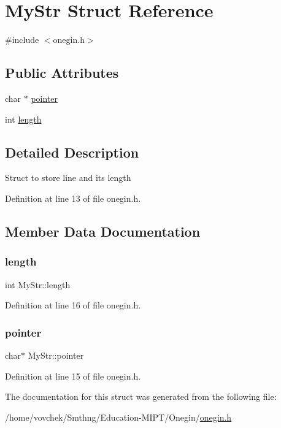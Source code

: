 \hypertarget{struct_my_str}{}\section{My\+Str Struct Reference}
\label{struct_my_str}


{\ttfamily \#include $<$onegin.\+h$>$}

\subsection*{Public Attributes}
\begin{DoxyCompactItemize}
\item 
char $\ast$ \hyperlink{struct_my_str_a46a731a64758ccc8a3c3f6ba531e860a}{pointer}
\item 
int \hyperlink{struct_my_str_abe750a45eca40ac1887722c2904d9006}{length}
\end{DoxyCompactItemize}


\subsection{Detailed Description}
Struct to store line and its length 

Definition at line 13 of file onegin.\+h.



\subsection{Member Data Documentation}
\mbox{\label{struct_my_str_abe750a45eca40ac1887722c2904d9006}} 
\subsubsection{\texorpdfstring{length}{length}}
{\footnotesize\ttfamily int My\+Str\+::length}



Definition at line 16 of file onegin.\+h.

\mbox{\label{struct_my_str_a46a731a64758ccc8a3c3f6ba531e860a}} 
\subsubsection{\texorpdfstring{pointer}{pointer}}
{\footnotesize\ttfamily char$\ast$ My\+Str\+::pointer}



Definition at line 15 of file onegin.\+h.



The documentation for this struct was generated from the following file\+:\begin{DoxyCompactItemize}
\item 
/home/vovchek/\+Smthng/\+Education-\/\+M\+I\+P\+T/\+Onegin/\hyperlink{onegin_8h}{onegin.\+h}\end{DoxyCompactItemize}
